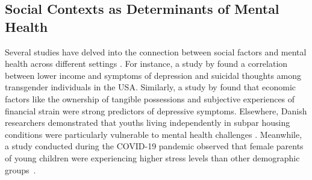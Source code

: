 \subsection{Social Contexts as Determinants of Mental Health}
Several studies have delved into the connection between social factors and mental health across different settings  \cite{brydsten2018health, lecerof2015does, han2015social, reibling2017depressed, li2022suffered, groot2022impact, de2017gender, frik2023model, oguamanam2023intersectional}. 
For instance, a study by \citet{katz2017self} found a correlation between lower income and symptoms of depression and suicidal thoughts among transgender individuals in the USA. Similarly, a study by \citet{guan2022financial} found that economic factors like the ownership of tangible possessions and subjective experiences of financial strain were strong predictors of depressive symptoms. Elsewhere, Danish researchers demonstrated that youths living independently in subpar housing conditions were particularly vulnerable to mental health challenges \cite{groot2022impact}. Meanwhile, a study conducted during the COVID-19 pandemic observed that female parents of young children were experiencing higher stress levels than other demographic groups~\cite{li2022suffered}. 




